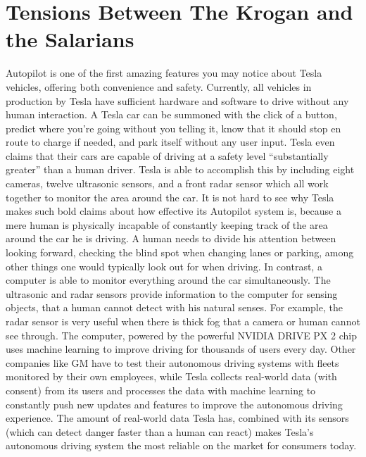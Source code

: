 \documentclass{IEEEtran}
\begin{document}
\section{Tensions Between The Krogan and the Salarians}
Autopilot is one of the first amazing features you may notice about Tesla vehicles,
offering both convenience and safety. Currently, all vehicles in production by Tesla
have sufficient hardware and software to drive without any human interaction.
A Tesla car can be summoned with the click of a button, predict where you're
going without you telling it, know that it should stop en route to charge if needed,
and park itself without any user input. Tesla even claims that their cars are capable of driving
at a safety level ``substantially greater'' than a human driver\cite{allcarsautopilot}.
Tesla is able to accomplish this by including eight cameras, twelve ultrasonic sensors, and a front radar
sensor which all work together to monitor the area around the car. It is not hard
to see why Tesla makes such bold claims about how effective its Autopilot system is,
because a mere human is physically incapable of constantly keeping track of the area around
the car he is driving. A human needs to divide his attention between looking forward,
checking the blind spot when changing lanes or parking, among other things one would typically
look out for when driving. In contrast, a computer is able to monitor everything
around the car simultaneously. The ultrasonic and radar sensors
provide information to the computer for sensing objects, that a human cannot
detect with his natural senses. For example, the radar sensor is very useful when
there is thick fog that a camera or human cannot see through. The computer, powered
by the powerful NVIDIA DRIVE PX 2 chip uses machine learning to improve driving for
thousands of users every day. Other companies like GM have to test their autonomous
driving systems with fleets monitored by their own employees, while Tesla collects
real-world data (with consent) from its users and processes the data with machine
learning to constantly push new updates and features to improve the autonomous
driving experience.\cite{tdata1}\cite{tdata2}\cite{tdata3}
The amount of real-world data Tesla has, combined with its sensors (which can
detect danger faster than a human can react\cite{predictcrash}) makes Tesla's
autonomous driving system the most reliable on the market for consumers today.

\end{document}
